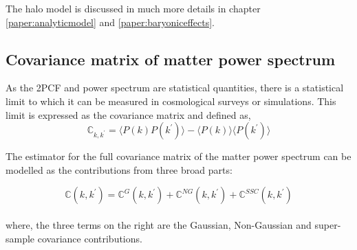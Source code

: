 The halo model is discussed in much more details in chapter \ref{paper:analyticmodel} 
and \ref{paper:baryoniceffects}.


\subsection{Covariance matrix of matter power spectrum}
As the 2PCF and power spectrum are statistical quantities, there is a statistical limit
to which it can be measured in cosmological surveys or simulations. This limit is expressed
as the covariance matrix and defined as,
\begin{equation}
	\mathbb{C}_{k,k^{\prime}}	= 
			\langle P(k)P(k^{\prime}) \rangle - 
			\langle P(k)\rangle \langle P(k^{\prime})\rangle
\end{equation}

The estimator for the full covariance matrix of the matter power spectrum 
can be modelled as the contributions from three broad parts:

\begin{equation}
	\mathbb{C}(k,k^{\prime}) = \mathbb{C}^{G}(k,k^{\prime}) + 
								\mathbb{C}^{NG}(k,k^{\prime}) + 
								\mathbb{C}^{SSC}(k,k^{\prime})
\end{equation}
\\
where, the three terms on the right are the Gaussian, Non-Gaussian and super-sample covariance contributions. 


